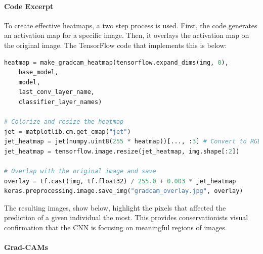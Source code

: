 \documentclass[twocolumn]{article}
\begin{document}
\paragraph{Code Excerpt}

To create effective heatmaps, a two step process is used. First, the code generates an activation map for a specific image. Then, it overlays the activation map on the original image. The TensorFlow code that implements this is below:

\begin{lstlisting}[language=Python,basicstyle=\footnotesize\ttfamily]
heatmap = make_gradcam_heatmap(tensorflow.expand_dims(img, 0),
    base_model,
    model,
    last_conv_layer_name,
    classifier_layer_names)

# Colorize and resize the heatmap
jet = matplotlib.cm.get_cmap("jet")
jet_heatmap = jet(numpy.uint8(255 * heatmap))[..., :3] # Convert to RGB
jet_heatmap = tensorflow.image.resize(jet_heatmap, img.shape[:2])

# Overlap with the original image and save
overlay = tf.cast(img, tf.float32) / 255.0 + 0.003 * jet_heatmap
keras.preprocessing.image.save_img("gradcam_overlay.jpg", overlay)
\end{lstlisting}
The resulting images, show below, highlight the pixels that affected the prediction of a given individual the most. This provides conservationists visual confirmation that the CNN is focusing on meaningful regions of images.

\paragraph{Grad-CAMs}
\end{document}
